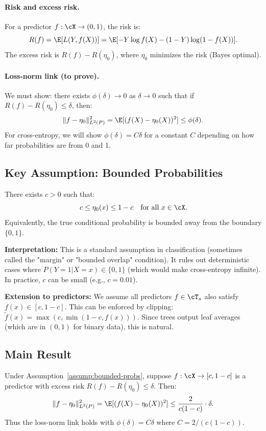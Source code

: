 \paragraph{Risk and excess risk.}
For a predictor $f: \cX \to (0,1)$, the risk is:
\[
R(f) = \E[L(Y, f(X))] = \E[-Y \log f(X) - (1-Y) \log(1-f(X))].
\]
The excess risk is $R(f) - R(\eta_0)$, where $\eta_0$ minimizes the risk (Bayes optimal).

\paragraph{Loss-norm link (to prove).}
We must show: there exists $\phi(\delta) \to 0$ as $\delta \to 0$ such that if $R(f) - R(\eta_0) \le \delta$, then:
\[
\|f - \eta_0\|_{L^2(P)}^2 = \E[(f(X) - \eta_0(X))^2] \le \phi(\delta).
\]
For cross-entropy, we will show $\phi(\delta) = C\delta$ for a constant $C$ depending on how far probabilities are from 0 and 1.

\subsection{Key Assumption: Bounded Probabilities}

\begin{assumption}
\label{assump:bounded-probs}
There exists $c > 0$ such that:
\[
c \le \eta_0(x) \le 1-c \quad \text{for all } x \in \cX.
\]
Equivalently, the true conditional probability is bounded away from the boundary $\{0, 1\}$.
\end{assumption}

\textbf{Interpretation:} This is a standard assumption in classification (sometimes called the "margin" or "bounded overlap" condition). It rules out deterministic cases where $P(Y=1|X=x) \in \{0,1\}$ (which would make cross-entropy infinite). In practice, $c$ can be small (e.g., $c = 0.01$).

\textbf{Extension to predictors:} We assume all predictors $f \in \cT_s$ also satisfy $f(x) \in [c, 1-c]$. This can be enforced by clipping: $\tilde{f}(x) = \max(c, \min(1-c, f(x)))$. Since trees output leaf averages (which are in $(0,1)$ for binary data), this is natural.

\subsection{Main Result}

\begin{lemma}
\label{lem:ce-loss-norm}
Under Assumption~\ref{assump:bounded-probs}, suppose $f: \cX \to [c, 1-c]$ is a predictor with excess risk $R(f) - R(\eta_0) \le \delta$. Then:
\[
\|f - \eta_0\|_{L^2(P)}^2 = \E[(f(X) - \eta_0(X))^2] \le \frac{2}{c(1-c)} \cdot \delta.
\]
Thus the loss-norm link holds with $\phi(\delta) = C\delta$ where $C = 2/(c(1-c))$.
\end{lemma}

